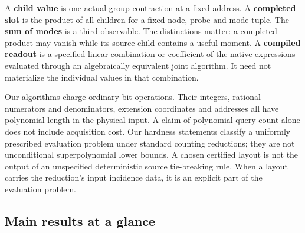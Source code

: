 \documentclass[
  11pt,
]{article}
\begin{document}
A \textbf{child value} is one actual group contraction at a fixed
address. A \textbf{completed slot} is the product of all children for a
fixed node, probe and mode tuple. The \textbf{sum of modes} is a third
observable. The distinctions matter: a completed product may vanish
while its source child contains a useful moment. A \textbf{compiled
readout} is a specified linear combination or coefficient of the native
expressions evaluated through an algebraically equivalent joint
algorithm. It need not materialize the individual values in that
combination.

Our algorithms charge ordinary bit operations. Their integers, rational
numerators and denominators, extension coordinates and addresses all
have polynomial length in the physical input. A claim of polynomial
query count alone does not include acquisition cost. Our hardness
statements classify a uniformly prescribed evaluation problem under
standard counting reductions; they are not unconditional superpolynomial
lower bounds. A chosen certified layout is not the output of an
unspecified deterministic source tie-breaking rule. When a layout
carries the reduction's input incidence data, it is an explicit part of
the evaluation problem.

\subsection{Main results at a glance}\label{v9-main-results-at-a-glance}
\end{document}
